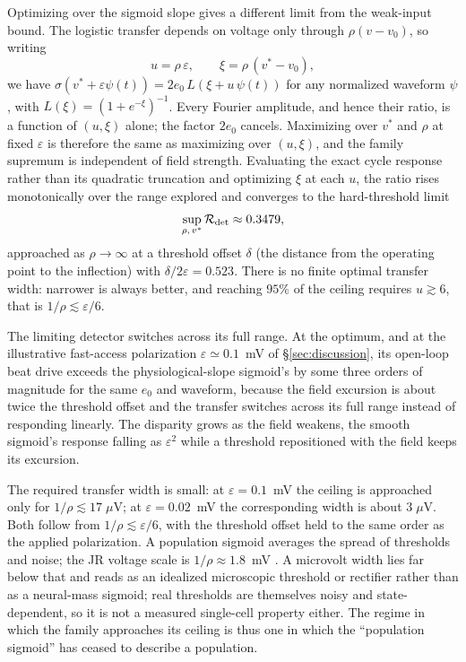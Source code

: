 \documentclass[11pt,a4paper]{article}
\newcommand{\Sig}{\sigma}
\begin{document}
Optimizing over the sigmoid slope gives a different limit from the weak-input bound.
The logistic transfer depends on voltage only through $\rho(v-v_0)$, so writing
\begin{equation}
u=\rho\,\varepsilon,\qquad \xi=\rho\,(v^*-v_0),
\label{eq:reduced}
\end{equation}
we have $\Sig(v^*+\varepsilon\psi(t))=2e_0\,L(\xi+u\,\psi(t))$ for any normalized waveform $\psi$,
with $L(\xi)=(1+e^{-\xi})^{-1}$. Every Fourier amplitude, and hence their ratio, is a function
of $(u,\xi)$ alone; the factor $2e_0$ cancels. Maximizing over $v^*$ and $\rho$ at fixed
$\varepsilon$ is therefore the same as maximizing over $(u,\xi)$, and the family supremum is
independent of field strength. Evaluating the exact cycle response rather than its
quadratic truncation and optimizing $\xi$ at each $u$, the ratio rises monotonically over the
range explored and converges to the hard-threshold limit
\begin{equation}
\sup_{\rho,\,v^*}\mathcal R_{\rm det}\approx0.3479 ,
\label{eq:etasup}
\end{equation}
approached as $\rho\to\infty$ at a threshold offset $\delta$ (the distance from the
operating point to the inflection) with $\delta/2\varepsilon=0.523$. There is no
finite optimal transfer width: narrower is always better, and reaching $95\%$ of the ceiling
requires $u\gtrsim6$, that is $1/\rho\lesssim\varepsilon/6$.

The limiting detector switches across its full range. At the optimum,
and at the illustrative fast-access polarization $\varepsilon\!\simeq\!0.1$~mV
of \S\ref{sec:discussion}, its open-loop beat drive
exceeds the physiological-slope sigmoid's by some three orders of magnitude for the same
$e_0$ and waveform, because the field excursion is about twice the threshold offset and the
transfer switches across its full range instead of responding linearly. The disparity grows
as the field weakens, the smooth sigmoid's response falling as $\varepsilon^2$ while a
threshold repositioned with the field keeps its excursion.

The required transfer width is small: at $\varepsilon=0.1$~mV the ceiling is approached only for
$1/\rho\lesssim17\;\mu$V; at $\varepsilon=0.02$~mV the corresponding width is
about $3\;\mu$V. Both follow from $1/\rho\lesssim\varepsilon/6$, with the
threshold offset held to the same order as the applied polarization. A population
sigmoid averages the spread of thresholds and noise; the JR voltage scale is
$1/\rho\approx1.8$~mV \cite{jansen1995}. A
microvolt width lies far below that and reads as an idealized microscopic threshold or
rectifier rather than as a neural-mass sigmoid; real thresholds are themselves noisy and
state-dependent, so it is not a measured single-cell property either. The
regime in which the family approaches its ceiling is thus one in which the ``population
sigmoid'' has ceased to describe a population.
\end{document}
